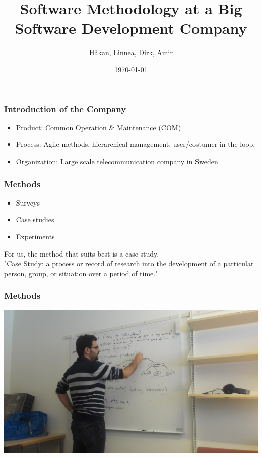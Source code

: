 \documentclass{beamer}
\begin{document}



\title{Software Methodology at a Big Software Development Company}
\author{H\aa kan, Linnea, Dirk, Amir}

\date{\today}

\begin{frame}
\titlepage
\end{frame}

\begin{frame}\frametitle{Introduction of the Company}
\begin{itemize}
\item Product: Common Operation \& Maintenance (COM)
\item Process: Agile methods, hierarchical management, user/costumer in the loop,  
\item Organization: Large scale telecommunication company in Sweden
\end{itemize}
\end{frame}

\begin{frame}
  \frametitle{Methods}
  \begin{itemize}
  \item Surveys
   \item Case studies
   \item Experiments
  \end{itemize}
  For us, the method that suits best is a case study. \\
  "Case Study: a process or record of research into the development of a particular person, group, or situation over a period of time."
\end{frame}

\begin{frame}
  \frametitle{Methods}
  \begin{center}
    \includegraphics[width=1\textwidth]{figs/amir.jpg}
  \end{center}
\end{frame}
\end{document}
